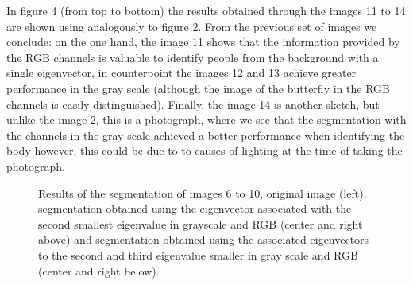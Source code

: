 \documentclass[conference]{IEEEtran}
\begin{document}
\newpage
In figure 4 (from top to bottom) the results obtained through the images 11 to 14 are shown using analogously to figure 2. From the previous set of images we conclude: on the one hand, the image 11 shows that the information provided by the RGB channels is valuable to identify people from the background with a single eigenvector, in counterpoint the images 12 and 13 achieve greater performance in the gray scale (although the image of the butterfly in the RGB channels is easily distinguished). Finally, the image 14 is another sketch, but unlike the image 2, this is a photograph, where we see that the segmentation with the channels in the gray scale achieved a better performance when identifying the body however, this could be due to to causes of lighting at the time of taking the photograph.
\begin{figure}[htbp]
\caption{Results of the segmentation of images 6 to 10, original image (left), segmentation obtained using the eigenvector associated with the second smallest eigenvalue in grayscale and RGB (center and right above) and segmentation obtained using the associated eigenvectors to the second and third eigenvalue smaller in gray scale and RGB (center and right below).}
\label{res2}
\end{figure}
\FloatBarrier
\newpage
\end{document}
